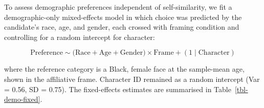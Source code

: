 \documentclass[
  man,
  floatsintext,
  longtable,
  nolmodern,
  notxfonts,
  notimes,
  draftfirst,
  colorlinks=true,linkcolor=blue,citecolor=blue,urlcolor=blue]{apa7}
\begin{document}
To assess demographic preferences independent of self-similarity, we fit
a demographic-only mixed-effects model in which choice was predicted by
the candidate's race, age, and gender, each crossed with framing
condition and controlling for a random intercept for character:

\[ 
\text{Preference} \sim 
\bigl(\text{Race} + \text{Age} + \text{Gender}\bigr) \times \text{Frame} + (1 \mid \text{Character})
\]

where the reference category is a Black, female face at the sample-mean
age, shown in the affiliative frame. Character ID remained as a random
intercept (Var = 0.56, SD = 0.75). The fixed-effects estimates are
summarised in Table~\ref{tbl-demo-fixed}.

\begin{table}

{\caption{{Fixed effects from the demographic-only model predicting
choice of the focal face.}{\label{tbl-demo-fixed}}}
\vspace{-20pt}}


\end{table}
\end{document}
